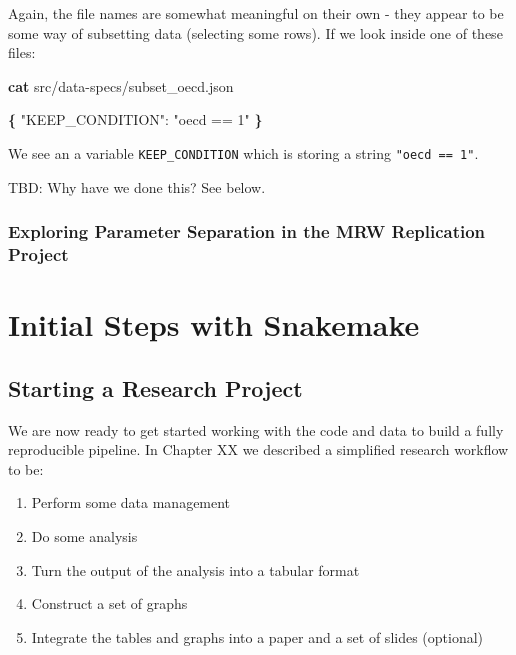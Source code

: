 \documentclass[]{book}
\newenvironment{Shaded}{\begin{snugshade}}{\end{snugshade}}
\newcommand{\KeywordTok}[1]{\textcolor[rgb]{0.13,0.29,0.53}{\textbf{{#1}}}}
\newcommand{\StringTok}[1]{\textcolor[rgb]{0.31,0.60,0.02}{{#1}}}
\newcommand{\NormalTok}[1]{{#1}}
\providecommand{\tightlist}{%
  \setlength{\itemsep}{0pt}\setlength{\parskip}{0pt}}
\theoremstyle{definition}
\theoremstyle{definition}
\theoremstyle{definition}
\theoremstyle{remark}
\begin{document}
Again, the file names are somewhat meaningful on their own - they appear
to be some way of subsetting data (selecting some rows). If we look
inside one of these files:

\begin{Shaded}
\begin{Highlighting}[]
\KeywordTok{cat} \NormalTok{src/data-specs/subset_oecd.json}
\end{Highlighting}
\end{Shaded}

\begin{Shaded}
\begin{Highlighting}[]
\KeywordTok{\{}
    \StringTok{"KEEP_CONDITION"}\NormalTok{: }\StringTok{"oecd == 1"}
\KeywordTok{\}}
\end{Highlighting}
\end{Shaded}

We see an a variable \texttt{KEEP\_CONDITION} which is storing a string
\texttt{"oecd\ ==\ 1"}.

TBD: Why have we done this? See below.

\subsection{Exploring Parameter Separation in the MRW Replication
Project}\label{exploring-parameter-separation-in-the-mrw-replication-project}

\chapter{Initial Steps with
Snakemake}\label{initial-steps-with-snakemake}

\section{Starting a Research Project}\label{starting-a-research-project}

We are now ready to get started working with the code and data to build
a fully reproducible pipeline. In Chapter XX we described a simplified
research workflow to be:

\begin{enumerate}
\def\labelenumi{\arabic{enumi}.}
\tightlist
\item
  Perform some data management
\item
  Do some analysis
\item
  Turn the output of the analysis into a tabular format
\item
  Construct a set of graphs
\item
  Integrate the tables and graphs into a paper and a set of slides
  (optional)
\end{enumerate}
\end{document}
